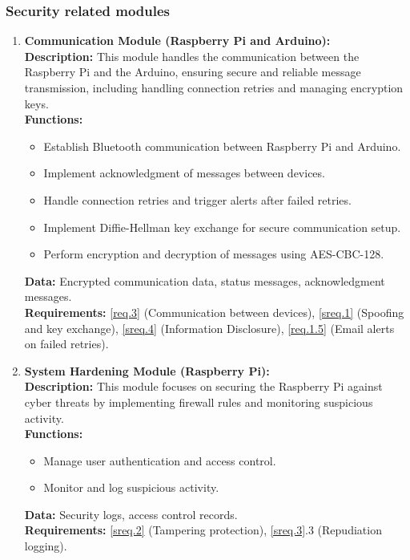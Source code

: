 \subsubsection{Security related modules}
\begin{enumerate}
    \item \textbf{Communication Module (Raspberry Pi and Arduino):} \\ 
        \textbf{Description:} This module handles the communication between the Raspberry Pi and the Arduino, ensuring secure and reliable message transmission, including handling connection retries and managing encryption keys. \\ 
        \textbf{Functions:}
        \begin{itemize}
            \item Establish Bluetooth communication between Raspberry Pi and Arduino.
            \item Implement acknowledgment of messages between devices.
            \item Handle connection retries and trigger alerts after failed retries.
            \item Implement Diffie-Hellman key exchange for secure communication setup.
            \item Perform encryption and decryption of messages using AES-CBC-128.
        \end{itemize}
        \textbf{Data:} Encrypted communication data, status messages, acknowledgment messages. \\ 
        \textbf{Requirements:} \ref{req.3} (Communication between devices), \ref{sreq.1} (Spoofing and key exchange), \ref{sreq.4} (Information Disclosure), \ref{req.1.5} (Email alerts on failed retries).

    \item \textbf{System Hardening Module (Raspberry Pi):} \\ 
        \textbf{Description:} This module focuses on securing the Raspberry Pi against cyber threats by implementing firewall rules and monitoring suspicious activity. \\ 
        \textbf{Functions:}
        \begin{itemize}
            \item Manage user authentication and access control.
            \item Monitor and log suspicious activity.
        \end{itemize}
        \textbf{Data:} Security logs, access control records. \\ 
        \textbf{Requirements:} \ref{sreq.2} (Tampering protection), \ref{sreq.3}.3 (Repudiation logging).
\end{enumerate}

